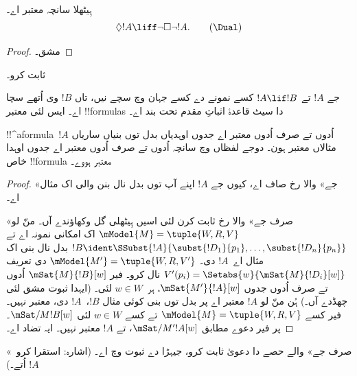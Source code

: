 \documentclass[../../../include/open-logic-section]{subfiles}
\begin{document}
\begin{prop}
  ہِیٹھلا سانچہ \Dual{} معتبر اے۔
  \begin{equation*}
  \Diamond !A \liff \lnot\Box\lnot !A. \tag{\Dual}
  \end{equation*}
\end{prop}

\begin{proof}
  مشق۔
\end{proof}

\begin{prob}
   ثابت کرو۔
\end{prob}

\begin{prop}
  جے $!A$ تے $!A \lif !B$ کسے نمونے دے کسے جہان وچ سچے نیں، تاں $!B$ وی اُتھے سچا اے۔ ایس لئی معتبر !!{formula}s دا سیٹ قاعدۂ اثباتِ مقدم تحت بند اے۔
\end{prop}

\begin{prop}
  !!^a{formula}~$!A$ اُدوں تے صرف اُدوں معتبر اے جدوں اوہدیاں بدل توں بنیاں ساریاں مثالاں معتبر ہون۔ دوجے لفظاں وچ سانچہ اُدوں تے صرف اُدوں معتبر اے جدوں اوہدا خاص !!{formula} معتبر ہووے۔
\end{prop}

\begin{proof}
  «جے» والا رخ صاف اے، کیوں جے $!A$ اپنے آپ توں بدل نال بنن والی اک مثال اے۔

  «صرف جے» والا رخ ثابت کرن لئی اسیں ہِیٹھلی گل وکھاؤندے آں۔ منّ لو
  $\mModel{M} = \tuple{W, R, V}$ اک امکانی نمونہ اے تے $!B \ident
  \SSubst{!A}{\subst{!D_1}{p_1},\dots,\subst{!D_n}{p_n}}$ بدل نال بنی اک مثال اے~$!A$ دی۔ $\mModel{M'} = \tuple{W, R,
    V'}$ دی تعریف $V'(p_i) = \Setabs{w}{\mSat{M}{!D_i}[w]}$ نال کرو۔ فیر
  $\mSat{M}{!B}[w]$ اُدوں تے صرف اُدوں جدوں $\mSat{M'}{!A}[w]$، ہر~$w \in W$ لئی۔ (ایہدا ثبوت مشق لئی چھڈدے آں۔) ہُن منّ لو $!A$ معتبر اے پر بدل توں بنی کوئی مثال $!B$،~$!A$ دی، معتبر نہیں۔ فیر کسے
  $\mModel{M} = \tuple{W, R, V}$ تے کسے $w \in W$ لئی
  $\mSat/{M}{!B}[w]$۔ پر فیر دعوے مطابق $\mSat/{M'}{!A}[w]$، تے
  $!A$ معتبر نہیں۔ ایہ تضاد اے۔
\end{proof}

\begin{prob}
  «صرف جے» والے حصے دا دعویٰ ثابت کرو، جیہڑا  دے ثبوت وچ اے۔ (اشارہ: استقرا کرو~$!A$ اُتے۔)
\end{prob}
\end{document}
